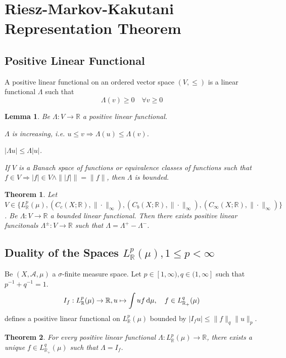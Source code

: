 \documentclass[11pt, a4paper, openany]{book}
\newtheorem{thm}{Theorem}\newtheorem{lem}{Lemma}\newtheorem{crl}{Corollary}
\theoremstyle{definition}
\newenvironment{tight_enumerate}{\begin{enumerate}\itemsep -0.2em}{\end{enumerate}}
\begin{document}
\section{Riesz-Markov-Kakutani Representation Theorem}
\subsection{Positive Linear Functional}
    A positive linear functional on an ordered vector space $(V,\leqslant)$ is a linear functional $\Lambda$ such that
    \[\Lambda(v)\geqslant 0\quad\forall v\geqslant 0\]
    \begin{lem}
        Be $\Lambda:V\rightarrow\mathbb{R}$ a positive linear functional.
        \begin{tight_enumerate}
            \item $\Lambda$ is increasing, i.e. $u\leqslant v\Longrightarrow \Lambda(u)\leqslant\Lambda(v)$.
            \item $|\Lambda u|\leqslant \Lambda |u|$.
            \item If $V$ is a Banach space of functions or equivalence classes of functions such that $f\in V\Longrightarrow |f|\in V\wedge \||f|\|=\|f\|$, then $\Lambda$ is bounded.
        \end{tight_enumerate}
    \end{lem}
    \begin{thm}
        Let $V\in\{L^p_{\mathbb{R}}(\mu),(C_c(X;\mathbb{R}),\|\cdot\|_\infty),(C_b(X;\mathbb{R}),\|\cdot\|_\infty),(C_\infty(X;\mathbb{R}),\|\cdot\|_\infty)\}$. Be $\Lambda:V\rightarrow \mathbb{R}$ a bounded linear functional. Then there exists positive linear funcitonals $\Lambda^{\pm}:V\rightarrow\mathbb{R}$ such that $\Lambda=\Lambda^+-\Lambda^-$.
    \end{thm}
\subsection{Duality of the Spaces \texorpdfstring{$L^p_\mathbb{R}(\mu),1\leqslant p<\infty$}{Lp, p<infty} }
    Be $(X,\mathscr{A},\mu)$ a $\sigma$-finite measure space. Let $p\in[1,\infty),q\in(1,\infty]$ such that $p^{-1}+q^{-1}=1$.
    \[I_f:L^p_\mathbb{R}(\mu)\rightarrow\mathbb{R},u\mapsto \int uf\odif \mu,\quad f\in L^q_{\mathbb{R}_+}(\mu)\]
    defines a positive linear functional on $L^p_\mathbb{R}(\mu)$ bounded by $|I_fu|\leqslant\|f\|_q\|u\|_p$.
    \begin{thm}
        For every positive linear functional $\Lambda:L^p_\mathbb{R}(\mu)\rightarrow\mathbb{R}$, there exists a unique $f\in L^q_{\mathbb{R}_+}(\mu)$ such that $\Lambda=I_f$.
    \end{thm}
\end{document}
